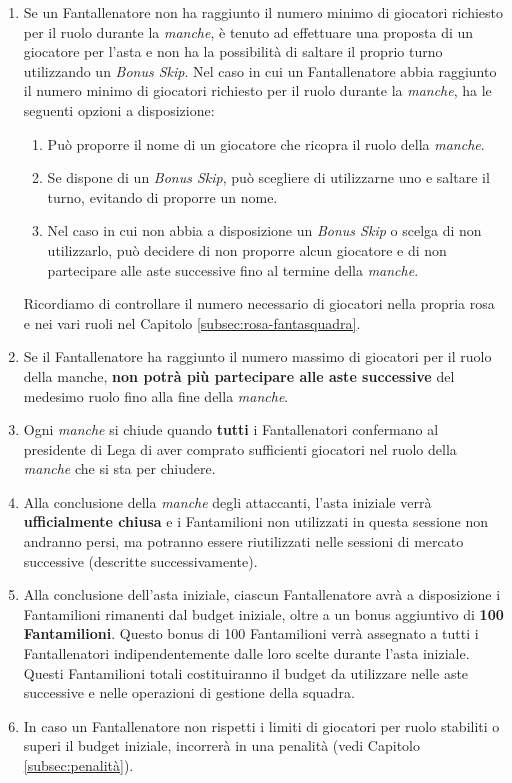 \documentclass[12pt]{article}
\begin{document}
\begin{enumerate}
\item Se un Fantallenatore non ha raggiunto il numero minimo di giocatori richiesto per il ruolo durante la \textit{manche}, è tenuto ad effettuare una proposta di un giocatore per l'asta e non ha la possibilità di saltare il proprio turno utilizzando un \textit{Bonus Skip}.
Nel caso in cui un Fantallenatore abbia raggiunto il numero minimo di giocatori richiesto per il ruolo durante la \textit{manche}, ha le seguenti opzioni a disposizione:
\begin{enumerate}
    \item Può proporre il nome di un giocatore che ricopra il ruolo della \textit{manche}.
    \item Se dispone di un \textit{Bonus Skip}, può scegliere di utilizzarne uno e saltare il turno, evitando di proporre un nome.
    \item Nel caso in cui non abbia a disposizione un \textit{Bonus Skip} o scelga di non utilizzarlo, può decidere di non proporre alcun giocatore e di non partecipare alle aste successive fino al termine della \textit{manche}.
\end{enumerate}
Ricordiamo di controllare il numero necessario di giocatori nella propria rosa e
nei vari ruoli nel Capitolo \ref{subsec:rosa-fantasquadra}.
\item Se il Fantallenatore ha raggiunto il numero massimo di giocatori per il ruolo della manche, \textbf{non potrà più partecipare alle aste successive} del medesimo ruolo fino alla fine della \textit{manche}.
\item Ogni \textit{manche} si chiude quando \textbf{tutti} i Fantallenatori confermano al presidente di Lega di aver comprato sufficienti giocatori nel ruolo della \textit{manche} che si sta per chiudere.
\item Alla conclusione della \textit{manche} degli attaccanti, l'asta iniziale verrà \textbf{ufficialmente chiusa} e i Fantamilioni non utilizzati in questa sessione non andranno persi, ma potranno essere riutilizzati nelle sessioni di mercato successive (descritte successivamente).
\item Alla conclusione dell'asta iniziale, ciascun Fantallenatore avrà a disposizione i Fantamilioni rimanenti dal budget iniziale, oltre a un bonus aggiuntivo di \textbf{100 Fantamilioni}. Questo bonus di 100 Fantamilioni verrà assegnato a tutti i Fantallenatori indipendentemente dalle loro scelte durante l'asta iniziale. Questi Fantamilioni totali costituiranno il budget da utilizzare nelle aste successive e nelle operazioni di gestione della squadra.
\item In caso un Fantallenatore non rispetti i limiti di giocatori per ruolo stabiliti o superi il budget iniziale, incorrerà in una penalità (vedi Capitolo \ref{subsec:penalità}).
\end{enumerate}
\end{document}
